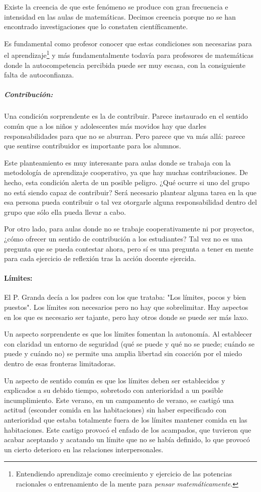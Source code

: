 Existe la creencia de que este fenómeno se produce con gran frecuencia e intensidad en las aulas de matemáticas. 
%
Decimos creencia porque no se han encontrado investigaciones que lo constaten científicamente.

Es fundamental como profesor conocer que estas condiciones son necesarias para el aprendizaje\footnote{Entendiendo aprendizaje como crecimiento y ejercicio de las potencias racionales o entrenamiento de la mente para \textit{pensar matemáticamente}.} y más fundamentalmente todavía para profesores de matemáticas donde la autocompetencia percibida puede ser muy escasa, con la consiguiente falta de autoconfianza.

\subparagraph{Contribución:} Una condición sorprendente es la de contribuir.
%
Parece instaurado en el sentido común que a los niños y adolescentes más movidos hay que darles responsabilidades para que no se aburran.
%
Pero parece que va más allá: parece que sentirse contribuidor es importante para los alumnos.

Este planteamiento es muy interesante para aulas donde se trabaja con la metodología de aprendizaje cooperativo, ya que hay muchas contribuciones.
%
De hecho, esta condición alerta de un posible peligro. 
%
¿Qué ocurre si uno del grupo no está siendo capaz de contribuir?
%
Será necesario plantear alguna tarea en la que esa persona pueda contribuir o tal vez otorgarle alguna responsabilidad dentro del grupo que sólo ella pueda llevar a cabo.

Por otro lado, para aulas donde no se trabaje cooperativamente ni por proyectos, ¿cómo ofrecer un sentido de contribución a los estudiantes?
%
Tal vez no es una pregunta que se pueda contestar ahora, pero sí es una pregunta a tener en mente para cada ejercicio de reflexión tras la acción docente ejercida.


\paragraph{Límites:} El P. Granda decía a los padres con los que trataba: "Los límites, pocos y bien puestos".
%
Los límites son necesarios pero no hay que sobrelimitar.
%
Hay aspectos en los que es necesario ser tajante, pero hay otros donde se puede ser más laxo.


Un aspecto sorprendente es que los límites fomentan la autonomía.
%
Al establecer con claridad un entorno de seguridad (qué se puede y qué no se puede; cuándo se puede y cuándo no) se permite una amplia libertad sin coacción por el miedo dentro de esas fronteras limitadoras.

Un aspecto de sentido común es que los límites deben ser establecidos y explicados a su debido tiempo, sobretodo con anterioridad a un posible incumplimiento.
%
Este verano, en un campamento de verano, se castigó una actitud (esconder comida en las habitaciones) sin haber especificado con anterioridad que estaba totalmente fuera de los límites mantener comida en las habitaciones.
%
Este castigo provocó el enfado de los acampados, que tuvieron que acabar aceptando y acatando un límite que no se había definido, lo que provocó un cierto deterioro en las relaciones interpersonales.

